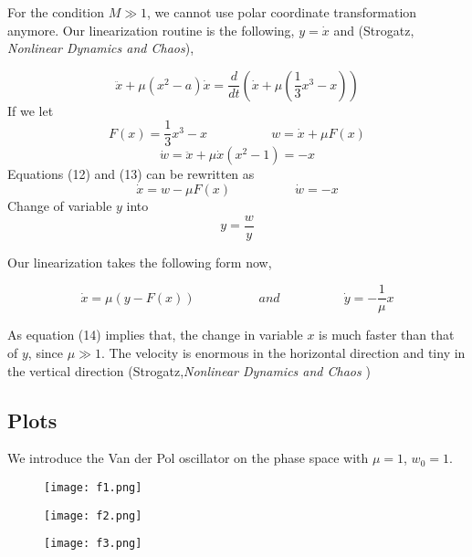 \documentclass[12pt]{article}
\begin{document}
For the condition $M \gg 1$, we cannot use polar coordinate transformation anymore. Our linearization routine is the following, $y=\dot{x}$ and (Strogatz, \textit{Nonlinear Dynamics and Chaos}),

\begin{equation*}
\ddot{x}+ \mu (x^2 -a) \dot{x} = \frac{d}{dt} (\dot{x} + \mu (\frac{1}{3} x^3 -x))
\end{equation*}
If we let
\begin{equation}
F(x) = \frac{1}{3} x^3 -x \;\;\;\;\;\;\;\;\; \;\;\;\;\;\;\;\;\; w = \dot{x} + \mu F(x)
\end{equation}
\begin{equation}
\dot{w} = \ddot{x} +\mu\dot{x} (x^2 -1) = -x 
\end{equation}
Equations (12) and (13) can be rewritten as
\begin{equation*}
\dot{x} = w - \mu F(x) \;\;\;\;\;\;\;\;\; \;\;\;\;\;\;\;\;\; \dot{w} = -x
\end{equation*}
Change of variable $y$ into 
\begin{equation*}
y= \frac{w}{y}
\end{equation*}

Our linearization takes the following form now,

\begin{equation}
\dot{x} = \mu (y - F(x)) \;\;\;\;\;\;\;\;\; \;\;\;\;\;\;\;\;\; and \;\;\;\;\;\;\;\;\; \;\;\;\;\;\;\;\;\; \dot{y} = - \frac{1}{\mu} x
\end{equation}

As equation (14) implies that, the change in variable $x$ is much faster than that of $y$, since $\mu \gg 1$. The velocity is enormous in the horizontal direction and tiny in the vertical direction (Strogatz,\textit{Nonlinear Dynamics and Chaos} )

\subsection{Plots}

We introduce the Van der Pol oscillator on the phase space with $\mu=1$, $w_0=1$. 

\begin{figure}[h!]
	\centering
	\texttt{[image: f1.png]}
		\caption{}
\end{figure}


\begin{figure}[h!]
	\centering
	\texttt{[image: f2.png]}
		\caption{}
\end{figure}

\begin{figure}[h!]
	\centering
	\texttt{[image: f3.png]}
		\caption{}
\end{figure}
\end{document}

